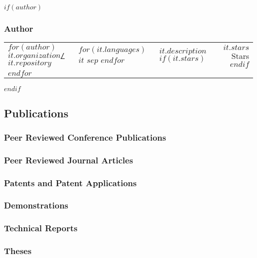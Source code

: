 \documentclass{article}
\begin{document}
$if(author)$
\subsubsection*{Author}
\begin{tabularx}{\textwidth}{llXr}
$for(author)$
  \href{$it.host$/$it.organization$/$it.repository$}{\texttt{$it.organization$/$it.repository$}} & $for(it.languages)$ $it$ $sep$ $endfor$ & $it.description$ $if(it.stars)$ & $it.stars$ Stars$endif$ \\
$endfor$
\end{tabularx}
$endif$

\subsection*{Publications}
\nocite{*}

\subsubsection*{Peer Reviewed Conference Publications}
\printbibliography[heading=none, resetnumbers=true, keyword={conference}]

\subsubsection*{Peer Reviewed Journal Articles}
\printbibliography[heading=none, resetnumbers=true, keyword={journal}]

\subsubsection*{Patents and Patent Applications}
\printbibliography[heading=none, resetnumbers=true, keyword={patent}]

\subsubsection*{Demonstrations}
\printbibliography[heading=none, resetnumbers=true, keyword={demo}]

\subsubsection*{Technical Reports}
\printbibliography[heading=none, resetnumbers=true, type={report}]

\subsubsection*{Theses}
\printbibliography[heading=none, resetnumbers=true, keyword={thesis}]
\end{document}
